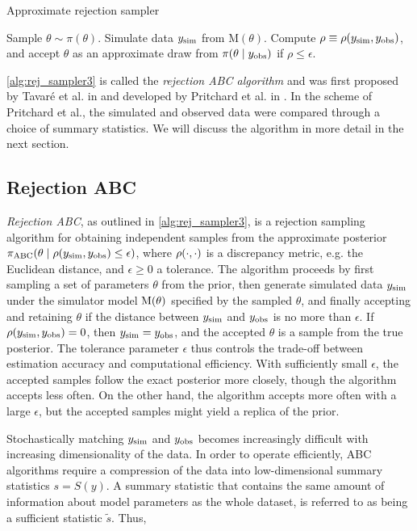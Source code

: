 \begin{algorithm}[H]
\caption{Approximate rejection sampler}
\label{alg:rej_sampler3}
\SetAlgoLined
\DontPrintSemicolon
 \nl Sample $\theta \sim \pi (\theta)$. \;
 \nl Simulate data $y_\mathrm{sim}$ from $\mathrm{M}(\theta)$. \;
 \nl Compute $\rho \equiv \rho \qty(y_\mathrm{sim}, y_\mathrm{obs})$, and accept $\theta$ as an approximate draw from $\pi \qty(\theta \mid y_\mathrm{obs})$ if $\rho \leq \epsilon$. \;
\end{algorithm}

\cref{alg:rej_sampler3} is called the \textit{rejection ABC algorithm} and was first proposed by Tavaré et al. in \cite{Tavare} and developed by Pritchard et al. in \cite{Pritchard}. In the scheme of Pritchard et al., the simulated and observed data were compared through a choice of summary statistics. We will discuss the algorithm in more detail in the next section. 


\subsection{Rejection ABC}

\textit{Rejection ABC}, as outlined in \cref{alg:rej_sampler3}, is a rejection sampling algorithm for obtaining independent samples from the approximate posterior $ \pi_\mathrm{ABC} \qty(\theta \mid \rho \qty(y_\mathrm{sim}, y_\mathrm{obs}) \leq \epsilon)$, where $\rho \qty(\cdot, \cdot)$ is a discrepancy metric, e.g. the Euclidean distance, and $\epsilon \geq 0$ a tolerance. The algorithm proceeds by first sampling a set of parameters $\theta$ from the prior, then generate simulated data $y_\mathrm{sim}$ under the simulator model $\mathrm{M}\qty(\theta)$ specified by the sampled $\theta$, and finally accepting and retaining $\theta$ if the distance between $y_\mathrm{sim}$ and $y_\mathrm{obs}$ is no more than $\epsilon$. If $\rho \qty(y_\mathrm{sim}, y_\mathrm{obs}) = 0$, then $y_\mathrm{sim} = y_\mathrm{obs}$, and the accepted $\theta$ is a sample from the true posterior. The tolerance parameter $\epsilon$ thus controls the trade-off between estimation accuracy and computational efficiency. With sufficiently small $\epsilon$, the accepted samples follow the exact posterior more closely, though the algorithm accepts less often. On the other hand, the algorithm accepts more often with a large $\epsilon$, but the accepted samples might yield a replica of the prior.  

Stochastically matching $y_\mathrm{sim}$ and $y_\mathrm{obs}$ becomes increasingly difficult with increasing dimensionality of the data. In order to operate efficiently, ABC algorithms require a compression of the data into low-dimensional summary statistics $s = S(y)$. A summary statistic that contains the same amount of information about model parameters as the whole dataset, is referred to as being a sufficient statistic $\tilde{s}$. Thus, 

